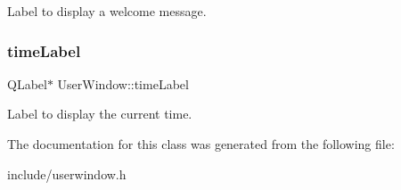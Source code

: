 Label to display a welcome message. \mbox{\label{classUserWindow_a8e334a68ebdb3dd0cdd449dbcf2e5ece}} 
\subsubsection{\texorpdfstring{time\+Label}{timeLabel}}
{\footnotesize\ttfamily Q\+Label$\ast$ User\+Window\+::time\+Label\hspace{0.3cm}{\ttfamily [private]}}

Label to display the current time. 

The documentation for this class was generated from the following file\+:\begin{DoxyCompactItemize}
\item 
include/userwindow.\+h\end{DoxyCompactItemize}
